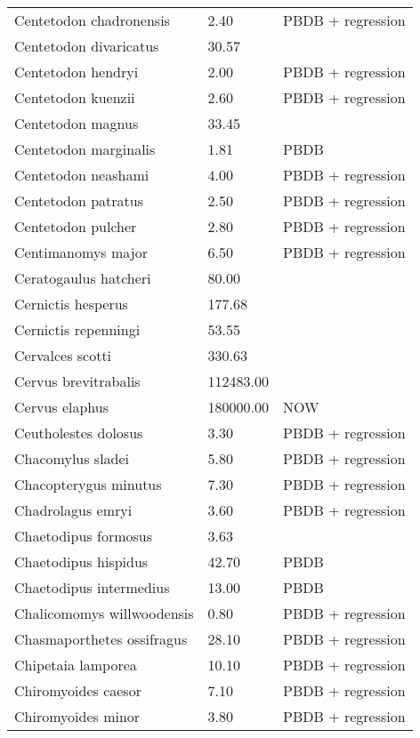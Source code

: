 \begin{longtable}{p{} p{} p{}}
    Centetodon chadronensis & 2.40 & PBDB + regression \\ 
    Centetodon divaricatus & 30.57 & \cite{Tomiya2013} \\ 
    Centetodon hendryi & 2.00 & PBDB + regression \\ 
    Centetodon kuenzii & 2.60 & PBDB + regression \\ 
    Centetodon magnus & 33.45 & \cite{Tomiya2013} \\ 
    Centetodon marginalis & 1.81 & PBDB \\ 
    Centetodon neashami & 4.00 & PBDB + regression \\ 
    Centetodon patratus & 2.50 & PBDB + regression \\ 
    Centetodon pulcher & 2.80 & PBDB + regression \\ 
    Centimanomys major & 6.50 & PBDB + regression \\ 
    Ceratogaulus hatcheri & 80.00 & \cite{Cassiliano2008} \\ 
    Cernictis hesperus & 177.68 & \cite{Tomiya2013} \\ 
    Cernictis repenningi & 53.55 & \cite{Hall1930} \\ 
    Cervalces scotti & 330.63 & \cite{Smith2004} \\ 
    Cervus brevitrabalis & 112483.00 & \cite{McKenna2011} \\ 
    Cervus elaphus & 180000.00 & NOW \\ 
    Ceutholestes dolosus & 3.30 & PBDB + regression \\ 
    Chacomylus sladei & 5.80 & PBDB + regression \\ 
    Chacopterygus minutus & 7.30 & PBDB + regression \\ 
    Chadrolagus emryi & 3.60 & PBDB + regression \\ 
    Chaetodipus formosus & 3.63 & \cite{Smith2004} \\ 
    Chaetodipus hispidus & 42.70 & PBDB \\ 
    Chaetodipus intermedius & 13.00 & PBDB \\ 
    Chalicomomys willwoodensis & 0.80 & PBDB + regression \\ 
    Chasmaporthetes ossifragus & 28.10 & PBDB + regression \\ 
    Chipetaia lamporea & 10.10 & PBDB + regression \\ 
    Chiromyoides caesor & 7.10 & PBDB + regression \\ 
    Chiromyoides minor & 3.80 & PBDB + regression \\ 

\end{longtable}
